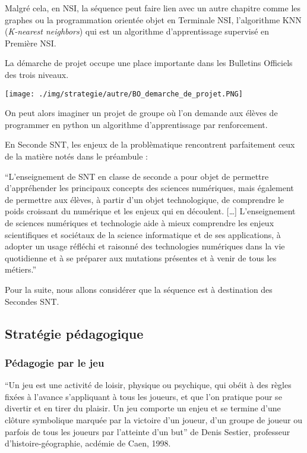\documentclass[
12pt,
french,
]{article}
\let\origfigure\figure
\let\endorigfigure\endfigure
\renewenvironment{figure}[1][2] {
  \expandafter\origfigure\expandafter[H]
} {
  \endorigfigure
}
\begin{document}
Malgré cela, en NSI, la séquence peut faire lien avec un autre chapitre
comme les graphes ou la programmation orientée objet en Terminale NSI,
l'algorithme KNN (\emph{K-nearest neighbors}) qui est un algorithme
d'apprentissage supervisé en Première NSI.

La démarche de projet occupe une place importante dans les Bulletins
Officiels des trois niveaux.

\begin{figure}
\centering
\texttt{[image: ./img/strategie/autre/BO\_demarche\_de\_projet.PNG]}
\caption{Extrait du Bulletin Officiel}
\end{figure}

On peut alors imaginer un projet de groupe où l'on demande aux élèves de
programmer en python un algorithme d'apprentissage par renforcement.

En Seconde SNT, les enjeux de la problèmatique rencontrent parfaitement
ceux de la matière notés dans le préambule :

``L'enseignement de SNT en classe de seconde a pour objet de permettre
d'appréhender les principaux concepts des sciences numériques, mais
également de permettre aux élèves, à partir d'un objet technologique, de
comprendre le poids croissant du numérique et les enjeux qui en
découlent. {[}\ldots{]} L'enseignement de sciences numériques et
technologie aide à mieux comprendre les enjeux scientifiques et
sociétaux de la science informatique et de ses applications, à adopter
un usage réfléchi et raisonné des technologies numériques dans la vie
quotidienne et à se préparer aux mutations présentes et à venir de tous
les métiers.''

Pour la suite, nous allons considérer que la séquence est à destination
des Secondes SNT.

\hypertarget{stratuxe9gie-puxe9dagogique}{%
\subsection{Stratégie pédagogique}\label{stratuxe9gie-puxe9dagogique}}

\hypertarget{puxe9dagogie-par-le-jeu}{%
\subsubsection{Pédagogie par le jeu}\label{puxe9dagogie-par-le-jeu}}

``Un jeu est une activité de loisir, physique ou psychique, qui obéit à
des règles fixées à l'avance s'appliquant à tous les joueurs, et que
l'on pratique pour se divertir et en tirer du plaisir. Un jeu comporte
un enjeu et se termine d'une clôture symbolique marquée par la victoire
d'un joueur, d'un groupe de joueur ou parfois de tous les joueurs par
l'atteinte d'un but'' de Denis Sestier, professeur
d'histoire-géographie, acdémie de Caen, 1998.
\end{document}
